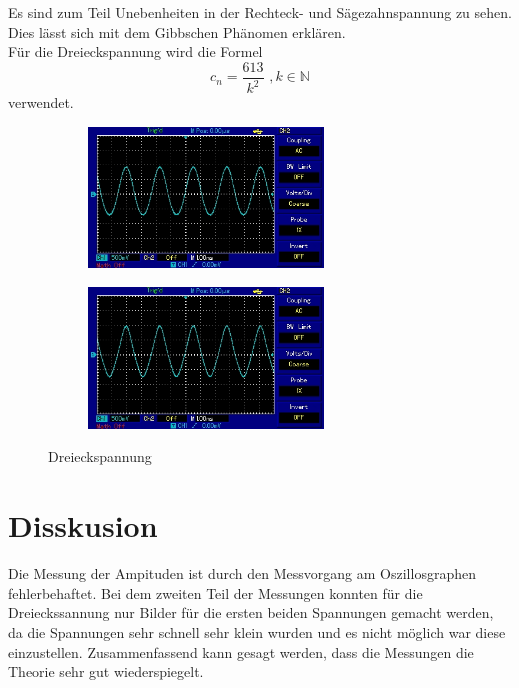 Es sind zum Teil Unebenheiten in der Rechteck- und Sägezahnspannung zu sehen.
Dies lässt sich mit dem Gibbschen Phänomen erklären.\\
\FloatBarrier
Für die Dreieckspannung wird die Formel
\begin{equation}
  c_n = \frac{613}{k^2} \, \, , k \in \mathds{N}
\end{equation}
verwendet.
\begin{figure}[h]
\centering
\begin{subfigure}{0.48\textwidth}
\centering
\includegraphics[height=3.75cm]{MAP012.jpg}
\label{fig:drei1}
\end{subfigure}
\begin{subfigure}{0.48\textwidth}
\centering
\includegraphics[height=3.75cm]{MAP014.jpg}
\label{fig:drei2}
\end{subfigure}
\caption{Dreieckspannung}
\label{fig:drei}
\end{figure}

\section{Disskusion}
Die Messung der Ampituden ist durch den Messvorgang am Oszillosgraphen fehlerbehaftet.
Bei dem zweiten Teil der Messungen
konnten für die Dreieckssannung nur Bilder für die ersten beiden Spannungen gemacht werden,
da die Spannungen sehr schnell sehr klein wurden und es nicht möglich war diese einzustellen.
Zusammenfassend kann gesagt werden, dass die Messungen die Theorie sehr gut wiederspiegelt.
